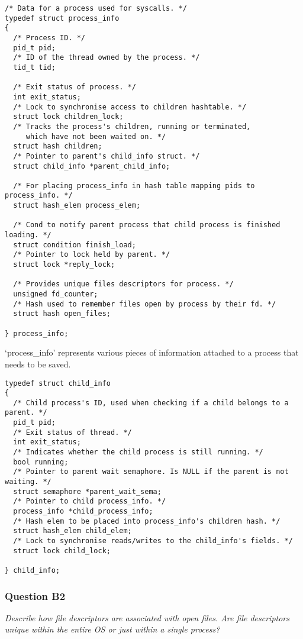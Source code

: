 \begin{verbatim}
/* Data for a process used for syscalls. */
typedef struct process_info
{
  /* Process ID. */
  pid_t pid;
  /* ID of the thread owned by the process. */
  tid_t tid;

  /* Exit status of process. */
  int exit_status;
  /* Lock to synchronise access to children hashtable. */
  struct lock children_lock;
  /* Tracks the process's children, running or terminated,
     which have not been waited on. */
  struct hash children;
  /* Pointer to parent's child_info struct. */
  struct child_info *parent_child_info;

  /* For placing process_info in hash table mapping pids to process_info. */
  struct hash_elem process_elem;

  /* Cond to notify parent process that child process is finished loading. */
  struct condition finish_load;
  /* Pointer to lock held by parent. */
  struct lock *reply_lock;

  /* Provides unique files descriptors for process. */
  unsigned fd_counter;
  /* Hash used to remember files open by process by their fd. */
  struct hash open_files;

} process_info;
\end{verbatim}
`process\_info' represents various pieces of information attached to a process
that needs to be saved.

\begin{verbatim}
typedef struct child_info
{
  /* Child process's ID, used when checking if a child belongs to a parent. */
  pid_t pid;
  /* Exit status of thread. */
  int exit_status;
  /* Indicates whether the child process is still running. */
  bool running;
  /* Pointer to parent wait semaphore. Is NULL if the parent is not waiting. */
  struct semaphore *parent_wait_sema;
  /* Pointer to child process_info. */
  process_info *child_process_info;
  /* Hash elem to be placed into process_info's children hash. */
  struct hash_elem child_elem;
  /* Lock to synchronise reads/writes to the child_info's fields. */
  struct lock child_lock;

} child_info;
\end{verbatim}

\subsubsection*{Question B2} %
\textit{Describe how file descriptors are associated with open files. Are file descriptors unique within the entire OS or just within a single process?}

